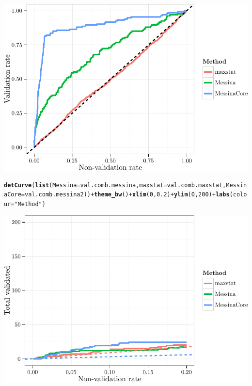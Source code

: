 \documentclass{article}\usepackage[]{graphicx}\usepackage[]{color}
\makeatletter
\def\maxwidth{ %
  \ifdim\Gin@nat@width>\linewidth
    \linewidth
  \else
    \Gin@nat@width
  \fi
}
\newcommand{\hlnum}[1]{\textcolor[rgb]{0.686,0.059,0.569}{#1}}%
\newcommand{\hlstr}[1]{\textcolor[rgb]{0.192,0.494,0.8}{#1}}%
\newcommand{\hlopt}[1]{\textcolor[rgb]{0,0,0}{#1}}%
\newcommand{\hlstd}[1]{\textcolor[rgb]{0.345,0.345,0.345}{#1}}%
\newcommand{\hlkwc}[1]{\textcolor[rgb]{0.333,0.667,0.333}{#1}}%
\newcommand{\hlkwd}[1]{\textcolor[rgb]{0.737,0.353,0.396}{\textbf{#1}}}%
\newenvironment{kframe}{%
 \def\at@end@of@kframe{}%
 \ifinner\ifhmode%
  \def\at@end@of@kframe{\end{minipage}}%
  \begin{minipage}{\columnwidth}%
 \fi\fi%
 \def\FrameCommand##1{\hskip\@totalleftmargin \hskip-\fboxsep
 \colorbox{shadecolor}{##1}\hskip-\fboxsep
     \hskip-\linewidth \hskip-\@totalleftmargin \hskip\columnwidth}%
 \MakeFramed {\advance\hsize-\width
   \@totalleftmargin\z@ \linewidth\hsize
   \@setminipage}}%
 {\par\unskip\endMakeFramed%
 \at@end@of@kframe}
\newenvironment{knitrout}{}{} %
\makeatother
\begin{document}
\begin{knitrout}
{\centering \includegraphics[width=\maxwidth]{figure/07-E3-E3-val-detcurves-6} 

}


\begin{kframe}\begin{alltt}
\hlkwd{detCurve}\hlstd{(}\hlkwd{list}\hlstd{(}\hlkwc{Messina} \hlstd{= val.comb.messina,} \hlkwc{maxstat} \hlstd{= val.comb.maxstat,} \hlkwc{MessinaCore} \hlstd{= val.comb.messina2))} \hlopt{+} \hlkwd{theme_bw}\hlstd{()} \hlopt{+} \hlkwd{xlim}\hlstd{(}\hlnum{0}\hlstd{,} \hlnum{0.2}\hlstd{)} \hlopt{+} \hlkwd{ylim}\hlstd{(}\hlnum{0}\hlstd{,} \hlnum{200}\hlstd{)} \hlopt{+} \hlkwd{labs}\hlstd{(}\hlkwc{colour} \hlstd{=} \hlstr{"Method"}\hlstd{)}
\end{alltt}


{\ttfamily\noindent\color{warningcolor}{\#\# Warning: Removed 6902 rows containing missing values (geom\_path).}}\end{kframe}

{\centering \includegraphics[width=\maxwidth]{figure/07-E3-E3-val-detcurves-7} 

}
\end{knitrout}
\end{document}
